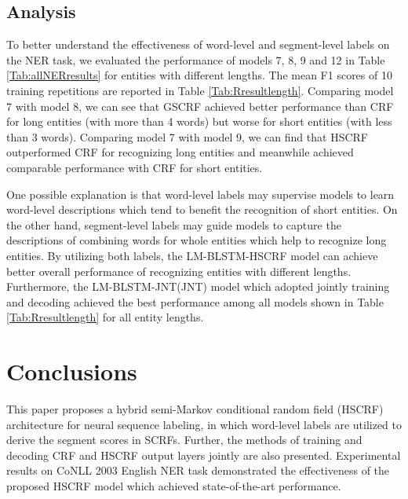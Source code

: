 \documentclass[11pt,a4paper]{article}
\begin{document}
\subsection{Analysis}

To better understand the effectiveness of word-level and segment-level labels on the NER task, we evaluated the performance of  models 7, 8, 9 and 12
in Table \ref{Tab:allNERresults} for entities with different lengths.
The mean F1 scores of 10 training repetitions are reported in Table \ref{Tab:Rresultlength}.
Comparing model 7 with model 8, we can see that GSCRF achieved better performance than CRF for long entities (with more than 4 words) but worse for short entities (with less than 3 words).
Comparing model 7 with model 9, we can find that HSCRF outperformed CRF for recognizing long entities and meanwhile achieved comparable performance with CRF for short entities.

One possible explanation is that word-level labels may supervise models to learn word-level descriptions which tend to benefit the recognition of short entities.
On the other hand, segment-level labels may guide models to capture the descriptions of combining words for whole entities which help to recognize long entities.
By utilizing both labels, the LM-BLSTM-HSCRF model can achieve better overall performance of recognizing entities with different lengths.
Furthermore, the LM-BLSTM-JNT(JNT) model which adopted jointly training and decoding
achieved the best performance among all models shown in Table \ref{Tab:Rresultlength} for all entity lengths.


\section{Conclusions}
This paper proposes a hybrid semi-Markov conditional random field (HSCRF) architecture for neural sequence labeling,
in which word-level labels are utilized to derive the segment scores in SCRFs.
Further, the methods of training and decoding CRF and HSCRF output layers jointly are also presented.
Experimental results on CoNLL 2003 English NER task demonstrated the effectiveness of the proposed HSCRF model which achieved state-of-the-art performance.




\end{document}
